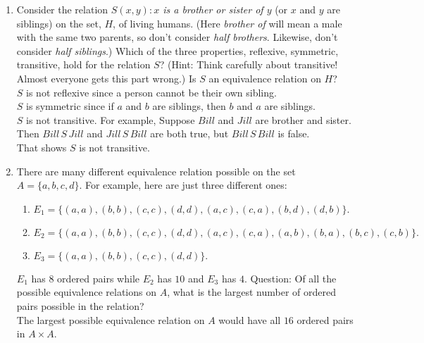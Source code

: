 \documentclass[11pt]{amsart}
\begin{document}
\begin{enumerate}
\item Consider the relation {\it $S(x,y) : x$ is a brother or sister of $y$} (or $x$ and $y$ are siblings) on the set, $H$,
of living humans. (Here {\it brother of} will mean a male with the same two parents, so don't consider {\it half brothers}. Likewise, don't consider {\itshape half siblings}.) Which of the three properties, reflexive, symmetric, transitive,
hold for the relation $S$? (Hint: Think carefully about transitive! Almost everyone gets this part wrong.) 
Is $S$ an  equivalence relation on $H$?\\[3pt]
{\color{blue}
$S$ is not reflexive since a person cannot be their own sibling. \\
$S$ is symmetric since if $a$ and $b$ are siblings, then $b$ and $a$ are siblings.\\
$S$ is not transitive. For example, Suppose $Bill$ and $Jill$ are brother and sister.\\
Then $Bill\,S\, Jill$ and $Jill\,S\,Bill$ are both true, but $Bill\,S\,Bill$ is false.\\
That shows $S$ is not transitive.\\[5pt]
}


\item  There are many different equivalence relation possible on the set $A=\{a,b,c,d\}$. For example,
here are just three different ones:\\[3pt]
\begin{enumerate} 
\item$E_{1} = \{(a,a), (b,b), (c,c), (d,d), (a,c), (c,a),(b,d),(d,b)\}.$\\[3pt]
\item$E_{2} = \{(a,a), (b,b), (c,c), (d,d), (a,c), (c,a),(a,b),(b,a),(b,c),(c,b)\}.$\\[3pt]
\item $E_{3} = \{(a,a), (b,b), (c,c), (d,d)\}.$\\[3pt]
\end{enumerate}

$E_{1}$ has $8$ ordered pairs while $E_{2}$ has $10$ and $E_{3}$ has $4$. Question: Of all the possible equivalence relations on $A$, what is the largest number of ordered pairs possible in the relation?\\[3pt]
{\color{blue}
The largest possible equivalence relation on $A$ would have all $16$ ordered pairs in $A\times A$.\\[5pt]
}



\end{enumerate}
\end{document}
